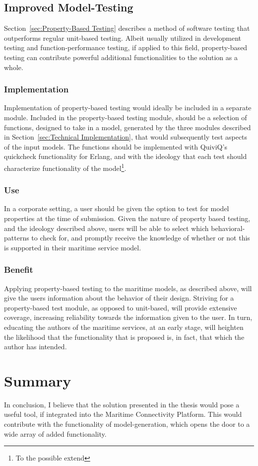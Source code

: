 \subsection{Improved Model-Testing}
Section~\ref{sec:Property-Based Testing} describes a method of software testing that outperforms regular unit-based testing. Albeit usually utilized in development testing and function-performance testing, if applied to this field, property-based testing can contribute powerful additional functionalities to the solution as a whole. 
\subsubsection{Implementation}
Implementation of property-based testing would ideally be included in a separate module. Included in the property-based testing module, should be a selection of functions, designed to take in a model, generated by the three modules described in Section~\ref{sec:Technical Implementation}, that would subsequently test aspects of the input models. The functions should be implemented with QuiviQ's quickcheck functionality for Erlang, and with the ideology that each test should characterize  functionality of the model\footnote{To the possible extend}.
\subsubsection{Use}
In a corporate setting, a user should be given the option to test for model properties at the time of submission. Given the nature of property based testing, and the ideology described above, users will be able to select which behavioral-patterns to check for, and promptly receive the knowledge of whether or not this is supported in their maritime service model.
\subsubsection{Benefit}
Applying property-based testing to the maritime models, as described above, will give the users information about the behavior of their design. Striving for a property-based test module, as opposed to unit-based, will provide extensive coverage, increasing reliability towards the information given to the user. In turn, educating the authors of the maritime services, at an early stage, will heighten the likelihood that the functionality that is proposed is, in fact, that which the author has intended.
\section{Summary}
In conclusion, I believe that the solution presented in the thesis would pose a useful tool, if integrated into the Maritime Connectivity Platform. This would contribute with the functionality of model-generation, which opens the door to a wide array of added functionality. 

